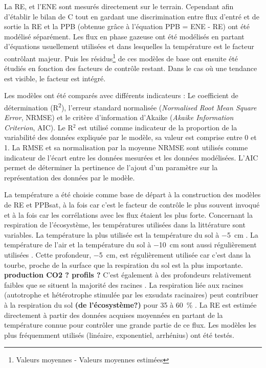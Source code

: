 La RE, et l'ENE sont mesurés directement sur le terrain.
Cependant afin d'établir le bilan de C tout en gardant une discrimination entre flux d'entré et de sortie la RE et la PPB (obtenue grâce à l'équation PPB = ENE - RE) ont été modélisé séparément.
Les flux en phase gazeuse ont été modélisés en partant d'équations usuellement utilisées et dans lesquelles la température est le facteur contrôlant majeur.
Puis les résidus\footnote{Valeurs moyennes - Valeurs moyennes estimées} de ces modèles de base ont ensuite été étudiés en fonction des facteurs de contrôle restant.
Dans le cas où une tendance est visible, le facteur est intégré.

Les modèles ont été comparés avec différents indicateurs : Le coefficient de détermination (R\textsuperscript{2}), l'erreur standard normalisée (\textit{Normalised Root Mean Square Error}, NRMSE) et le critère d'information d'Akaike (\textit{Akaike Information Criterion}, AIC).
Le R$^{2}$ est utilisé comme indicateur de la proportion de la variabilité des données expliquée par le modèle, sa valeur est comprise entre 0 et 1.
La RMSE et sa normalisation par la moyenne NRMSE sont utilisés comme indicateur de l'écart entre les données mesurées et les données modélisées.
L'AIC permet de déterminer la pertinence de l'ajout d'un paramètre sur la représentation des données par le modèle.

La température a été choisie comme base de départ à la construction des modèles de RE et PPBsat, à la fois car c'est le facteur de contrôle le plus souvent invoqué et à la fois car les corrélations avec les flux étaient les plus forte.
Concernant la respiration de l'écosystème, les températures utilisées dans la littérature sont variables.
La température la plus utilisée est la température du sol à \SI{-5}{\centi\metre}  \citep{ballantyne2014}.
La température de l'air et la température du sol à \SI{-10}{\centi\metre} sont aussi régulièrement utilisées \citep{bortoluzzi2006,kim1992}.
Cette profondeur, \SI{-5}{\cm}, est régulièrement utilisée car c'est dans la tourbe, proche de la surface que la respiration du sol est la plus importante.
\textbf{production CO2 ? profils ?}
C'est également à des profondeurs relativement faibles que se situent la majorité des racines \plop.
La respiration liée aux racines (autotrophe et hétérotrophe stimulée par les exsudats racinaires) peut contribuer à la respiration du sol \textbf{(de l'écosystème?)} pour 35 à \SI{60}{\percent} \citep{silvola1996,crow2005}.
La RE est estimée directement à partir des données acquises moyennées en partant de la température connue pour contrôler une grande partie de ce flux.
Les modèles les plus fréquemment utilisés (linéaire, exponentiel, arrhénius) ont été testés.

